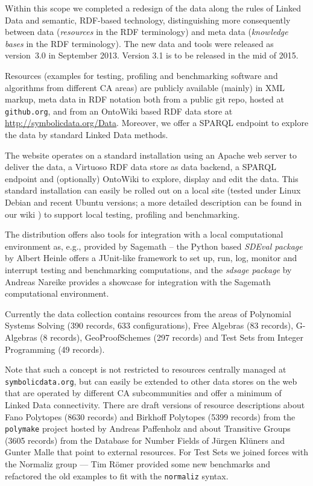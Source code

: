 \documentclass[11pt]{article}
\begin{document}
Within this scope we completed a redesign of the data along the rules of Linked
Data and semantic, RDF-based technology, distinguishing more consequently
between data (\emph{resources} in the RDF terminology) and meta data
(\emph{knowledge bases} in the RDF terminology).  The new {\SD} data and tools
were released as version~3.0 in September 2013.  Version 3.1 is to be released
in the mid of 2015.

Resources (examples for testing, profiling and benchmarking software and
algorithms from different CA areas) are publicly available (mainly) in XML
markup, meta data in RDF notation both from a public git repo, hosted at
\texttt{github.org}, and from an OntoWiki based RDF data store at
\url{http://symbolicdata.org/Data}.  Moreover, we offer a SPARQL endpoint to
explore the data by standard Linked Data methods.

The website operates on a standard installation using an Apache web server to
deliver the data, a Virtuoso RDF data store as data backend, a SPARQL endpoint
and (optionally) OntoWiki to explore, display and edit the data.  This standard
installation can easily be rolled out on a local site (tested under Linux
Debian and recent Ubuntu versions; a more detailed description can be found in
our wiki \cite{sdwiki}) to support local testing, profiling and benchmarking.

The distribution offers also tools for integration with a local computational
environment as, e.g., provided by Sagemath \cite{Sagemath} -- the Python based
\emph{SDEval package} \cite{sdeval} by Albert Heinle offers a JUnit-like
framework to set up, run, log, monitor and interrupt testing and benchmarking
computations, and the \emph{sdsage package} \cite{sdsage} by Andreas Nareike
provides a showcase for {\SD} integration with the Sagemath computational
environment.

Currently the {\SD} data collection contains resources from the areas of
Polynomial Systems Solving (390 records, 633 configurations), Free Algebras (83
records), G-Algebras (8 records), GeoProofSchemes (297 records) and Test Sets
from Integer Programming (49 records).

Note that such a concept is not restricted to resources centrally managed at
\texttt{symbolicdata.org}, but can easily be extended to other data stores on
the web that are operated by different CA subcommunities and offer a minimum of
Linked Data connectivity.  There are draft versions of resource descriptions
about Fano Polytopes (8630 records) and Birkhoff Polytopes (5399 records) from
the \texttt{polymake} project hosted by Andreas Paffenholz and about Transitive
Groups (3605 records) from the Database for Number Fields of J{\"u}rgen
Kl{\"u}ners and Gunter Malle that point to external resources.  For Test Sets
we joined forces with the Normaliz group --- Tim R{\"o}mer provided some new
benchmarks and refactored the old examples to fit with the \texttt{normaliz}
syntax.
\end{document}

